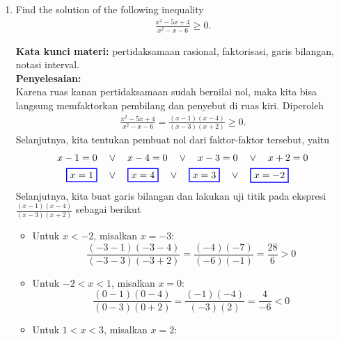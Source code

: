 \documentclass[10pt,openany,a4paper]{article}
\theoremstyle{definition}
\theoremstyle{definition}
\theoremstyle{plain}
\newenvironment{jawab}[2][tes]{%
\par\noindent\textbf{Kata kunci materi:} #1.\\
\textbf{Penyelesaian:} #2%
}{}
\begin{document}
\begin{enumerate}
    \item Find the solution of the following inequality
    \begin{align*}
        \frac{x^2-5x+4}{x^2-x-6}\geq 0.
    \end{align*}
    \begin{jawab}[pertidaksamaan rasional, faktorisasi, garis bilangan, notasi interval]{~\\
    Karena ruas kanan pertidaksamaan sudah bernilai nol, maka kita bisa langsung memfaktorkan pembilang dan penyebut di ruas kiri. Diperoleh
    \begin{align*}
        \frac{x^2-5x+4}{x^2-x-6} = \frac{(x-1)(x-4)}{(x-3)(x+2)} \geq 0.
    \end{align*}
    Selanjutnya, kita tentukan pembuat nol dari faktor-faktor tersebut, yaitu
    \begin{align*}
        x-1 = 0 \quad &\vee\quad x-4 = 0 \quad \vee\quad x-3 = 0 \quad \vee\quad x+2 = 0\\
        \colorlet{oldcolor}{.}
        \color{blue}
        \setlength{\fboxrule}{1pt} \boxed{\color{oldcolor}x=1}\color{oldcolor} \quad &\vee\quad \colorlet{oldcolor}{.}
        \color{blue}
        \setlength{\fboxrule}{1pt} \boxed{\color{oldcolor}x=4}\color{oldcolor} \quad \vee\quad \colorlet{oldcolor}{.}
        \color{blue}
        \setlength{\fboxrule}{1pt} \boxed{\color{oldcolor}x=3}\color{oldcolor} \quad \vee\quad \colorlet{oldcolor}{.}
        \color{blue}
        \setlength{\fboxrule}{1pt} \boxed{\color{oldcolor}x=-2}\color{oldcolor}
    \end{align*}
    Selanjutnya, kita buat garis bilangan dan lakukan uji titik pada ekspresi \(\frac{(x-1)(x-4)}{(x-3)(x+2)}\) sebagai berikut
    \begin{itemize}
        \item Untuk \(x < -2\), misalkan \(x = -3\):
        \[
        \frac{(-3-1)(-3-4)}{(-3-3)(-3+2)} = \frac{(-4)(-7)}{(-6)(-1)} = \frac{28}{6} > 0
        \]
        \item Untuk \(-2 < x < 1\), misalkan \(x = 0\):
        \[
        \frac{(0-1)(0-4)}{(0-3)(0+2)} = \frac{(-1)(-4)}{(-3)(2)} = \frac{4}{-6} < 0
        \]
        \item Untuk \(1 < x < 3\), misalkan \(x = 2\):

\end{itemize}}
\end{jawab}
\end{enumerate}
\end{document}
